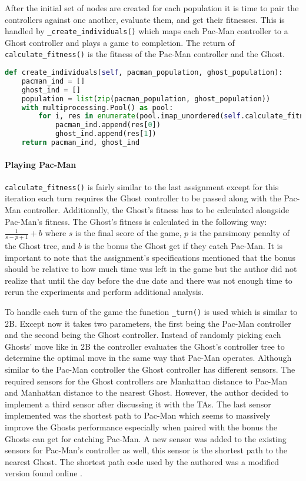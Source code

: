After the initial set of nodes are created for each population it is time to pair the controllers against one another, evaluate them, and get their fitnesses.
This is handled by \texttt{\_create\_individuals()} which maps each Pac-Man controller to a Ghost controller and plays a game to completion.
The return of \texttt{calculate\_fitness()} is the fitness of the Pac-Man controller and the Ghost.

\begin{lstlisting}[language=Python]
def create_individuals(self, pacman_population, ghost_population):
    pacman_ind = []
    ghost_ind = []
    population = list(zip(pacman_population, ghost_population))
    with multiprocessing.Pool() as pool:
        for i, res in enumerate(pool.imap_unordered(self.calculate_fitness, population)):
            pacman_ind.append(res[0])
            ghost_ind.append(res[1])
    return pacman_ind, ghost_ind
\end{lstlisting}

\paragraph{Playing Pac-Man}

\texttt{calculate\_fitness()} is fairly similar to the last assignment except for this iteration each turn requires the Ghost controller to be passed along with the Pac-Man controller.
Additionally, the Ghost's fitness has to be calculated alongside Pac-Man's fitness.
The Ghost's fitness is calculated in the following way: $\frac{1}{s - p + 1} + b$ where $s$ is the final score of the game, $p$ is the parsimony penalty of the Ghost tree, and $b$ is the bonus the Ghost get if they catch Pac-Man.
It is important to note that the assignment's specifications mentioned that the bonus should be relative to how much time was left in the game but the author did not realize that until the day before the due date and there was not enough time to rerun the experiments and perform additional analysis.

To handle each turn of the game the function \texttt{\_turn()} is used which is similar to 2B. 
Except now it takes two parameters, the first being the Pac-Man controller and the second being the Ghost controller.
Instead of randomly picking each Ghosts' move like in 2B the controller evaluates the Ghost's controller tree to determine the optimal move in the same way that Pac-Man operates.
Although similar to the Pac-Man controller the Ghost controller has different sensors.
The required sensors for the Ghost controllers are Manhattan distance to Pac-Man and Manhattan distance to the nearest Ghost.
However, the author decided to implement a third sensor after discussing it with the TAs. 
The last sensor implemented was the shortest path to Pac-Man which seems to massively improve the Ghosts performance especially when paired with the bonus the Ghosts can get for catching Pac-Man.
A new sensor was added to the existing sensors for Pac-Man's controller as well, this sensor is the shortest path to the nearest Ghost.
The shortest path code used by the authored was a modified version found online \cite{stutipathak31jan_2020}.

